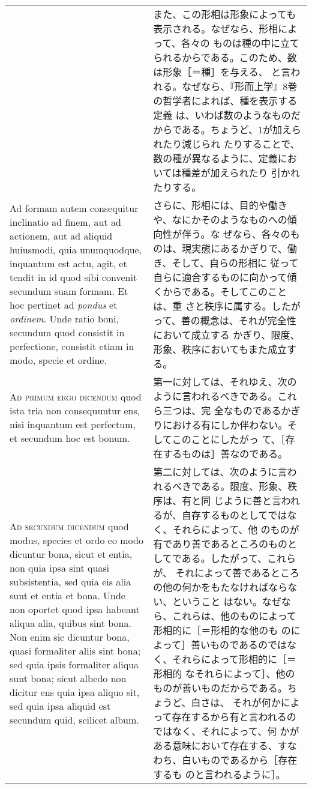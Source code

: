 \documentclass[10pt]{jsarticle}
\begin{document}
\begin{longtable}{p{21em}p{21em}}
&


また、この形相は形象によっても表示される。なぜなら、形相によって、各々の
 ものは種の中に立てられるからである。このため、数は形象［＝種］を与える、
 と言われる。なぜなら、『形而上学』8巻の哲学者によれば、種を表示する定義
 は、いわば数のようなものだからである。ちょうど、1が加えられたり減じられ
 たりすることで、数の種が異なるように、定義においては種差が加えられたり
 引かれたりする。

\\

Ad formam autem consequitur inclinatio ad finem, aut ad actionem, aut ad
 aliquid huiusmodi, quia unumquodque, inquantum est actu, agit, et
 tendit in id quod sibi convenit secundum suam formam. Et hoc pertinet
 ad {\itshape pondus} et {\itshape ordinem}. Unde ratio boni, secundum quod consistit in
 perfectione, consistit etiam in modo, specie et ordine.

&

さらに、形相には、目的や働きや、なにかそのようなものへの傾向性が伴う。な
 ぜなら、各々のものは、現実態にあるかぎりで、働き、そして、自らの形相に
 従って自らに適合するものに向かって傾くからである。そしてこのことは、重
 さと秩序に属する。したがって、善の概念は、それが完全性において成立する
 かぎり、限度、形象、秩序においてもまた成立する。


\\

{\scshape Ad primum ergo dicendum} quod ista tria non consequuntur ens, nisi
 inquantum est perfectum, et secundum hoc est bonum.

&

第一に対しては、それゆえ、次のように言われるべきである。これら三つは、完
 全なものであるかぎりにおける有にしか伴わない。そしてこのことにしたがっ
 て、［存在するものは］善なのである。

\\

{\scshape Ad secundum dicendum} quod modus, species et ordo eo modo dicuntur
 bona, sicut et entia, non quia ipsa sint quasi subsistentia, sed quia
 eis alia sunt et entia et bona. Unde non oportet quod ipsa habeant
 aliqua alia, quibus sint bona. Non enim sic dicuntur bona, quasi
 formaliter aliis sint bona; sed quia ipsis formaliter aliqua sunt bona;
 sicut albedo non dicitur ens quia ipsa aliquo sit, sed quia ipsa
 aliquid est secundum quid, scilicet album.

&

第二に対しては、次のように言われるべきである。限度、形象、秩序は、有と同
 じように善と言われるが、自存するものとしてではなく、それらによって、他
 のものが有であり善であるところのものとしてである。したがって、これらが、
 それによって善であるところの他の何かをもたなければならない、ということ
 はない。なぜなら、これらは、他のものによって形相的に［＝形相的な他のも
 のによって］善いものであるのではなく、それらによって形相的に［＝形相的
 なそれらによって］、他のものが善いものだからである。ちょうど、白さは、
 それが何かによって存在するから有と言われるのではなく、それによって、何
 かがある意味において存在する、すなわち、白いものであるから［存在するも
 のと言われるように］。


\end{longtable}
\end{document}
